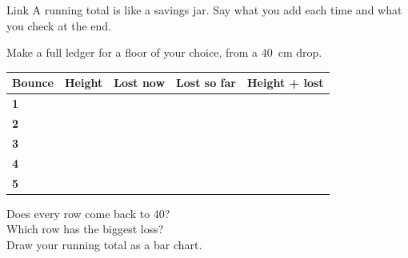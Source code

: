 \begin{puzzle}{Link}
A running total is like a savings jar. Say what you add each time and what you check at the end. \wline[6cm]
\end{puzzle}
\clearpage

\thispagestyle{fancy}
Make a full ledger for a floor of your choice, from a 40~cm drop.\par\medskip
\renewcommand{\arraystretch}{2.8}
\begin{tabularx}{\linewidth}{|>{\sffamily\small\bfseries}p{2.2cm}|X|X|X|X|}
\hline
Bounce & Height & Lost now & Lost so far & Height + lost \\ \hline
1 & & & & \\ \hline
2 & & & & \\ \hline
3 & & & & \\ \hline
4 & & & & \\ \hline
5 & & & & \\ \hline
\end{tabularx}

\vspace{8pt}
Does every row come back to 40? \wline[7cm]\\[10pt]
Which row has the biggest loss? \wline[5cm]\\[10pt]
Draw your running total as a bar chart.\par\medskip
{}
\clearpage
